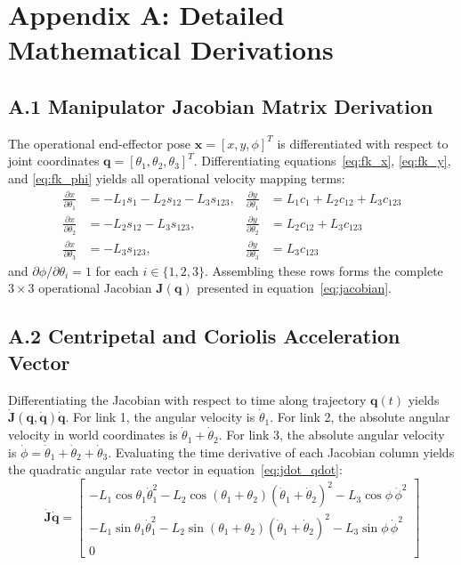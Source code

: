 \documentclass{article}
\begin{document}
\newpage



\newpage
\appendix
\section*{Appendix A: Detailed Mathematical Derivations}

\subsection*{A.1 Manipulator Jacobian Matrix Derivation}
The operational end-effector pose $\mathbf{x} = [x, y, \phi]^T$ is differentiated with respect to joint coordinates $\mathbf{q} = [\theta_1, \theta_2, \theta_3]^T$. Differentiating equations~\eqref{eq:fk_x}, \eqref{eq:fk_y}, and \eqref{eq:fk_phi} yields all operational velocity mapping terms:
\begin{align}
\frac{\partial x}{\partial \theta_1} &= -L_1 s_1 - L_2 s_{12} - L_3 s_{123}, & \frac{\partial y}{\partial \theta_1} &= L_1 c_1 + L_2 c_{12} + L_3 c_{123} \\
\frac{\partial x}{\partial \theta_2} &= -L_2 s_{12} - L_3 s_{123}, & \frac{\partial y}{\partial \theta_2} &= L_2 c_{12} + L_3 c_{123} \\
\frac{\partial x}{\partial \theta_3} &= -L_3 s_{123}, & \frac{\partial y}{\partial \theta_3} &= L_3 c_{123}
\end{align}
and $\partial \phi / \partial \theta_i = 1$ for each $i \in \{1, 2, 3\}$. Assembling these rows forms the complete $3 \times 3$ operational Jacobian $\mathbf{J}(\mathbf{q})$ presented in equation~\eqref{eq:jacobian}.

\subsection*{A.2 Centripetal and Coriolis Acceleration Vector}
Differentiating the Jacobian with respect to time along trajectory $\mathbf{q}(t)$ yields $\dot{\mathbf{J}}(\mathbf{q}, \dot{\mathbf{q}})\dot{\mathbf{q}}$. For link 1, the angular velocity is $\dot{\theta}_1$. For link 2, the absolute angular velocity in world coordinates is $\dot{\theta}_1 + \dot{\theta}_2$. For link 3, the absolute angular velocity is $\dot{\phi} = \dot{\theta}_1 + \dot{\theta}_2 + \dot{\theta}_3$.
Evaluating the time derivative of each Jacobian column yields the quadratic angular rate vector in equation~\eqref{eq:jdot_qdot}:
\begin{equation}
\dot{\mathbf{J}}\dot{\mathbf{q}} = \begin{bmatrix}
-L_1 \cos\theta_1 \dot{\theta}_1^2 - L_2 \cos(\theta_1+\theta_2)(\dot{\theta}_1+\dot{\theta}_2)^2 - L_3 \cos\phi \, \dot{\phi}^2 \\
-L_1 \sin\theta_1 \dot{\theta}_1^2 - L_2 \sin(\theta_1+\theta_2)(\dot{\theta}_1+\dot{\theta}_2)^2 - L_3 \sin\phi \, \dot{\phi}^2 \\
0
\end{bmatrix}
\end{equation}
\end{document}
